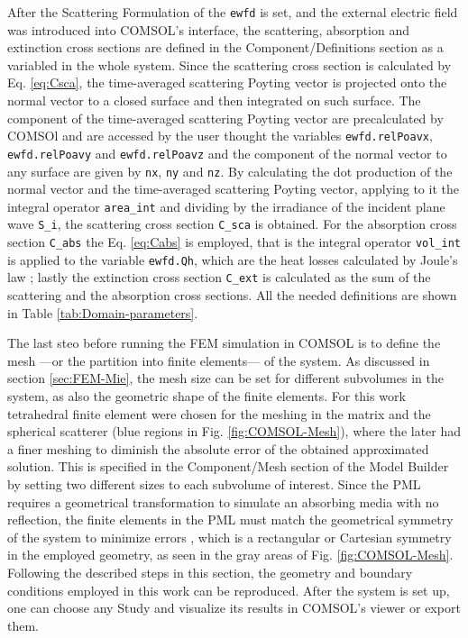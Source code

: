 After the Scattering Formulation of the \lstinline!ewfd! is set, and the external electric field was introduced into COMSOL's interface, the scattering, absorption and extinction cross sections are defined in the Component/Definitions section as a variabled in the whole system. Since the scattering cross section is calculated by Eq. \eqref{eq:Csca}, the time-averaged scattering Poyting vector is projected onto the normal vector to a closed surface and then integrated on such surface. The component of the time-averaged scattering Poyting vector are precalculated by COMSOl and are accessed by the user thought the variables  \lstinline!ewfd.relPoavx!, \lstinline!ewfd.relPoavy! and \lstinline!ewfd.relPoavz! \cite{comsol_wave} and the component of the normal vector to any surface are given by \lstinline!nx!, \lstinline!ny! and \lstinline!nz!. By calculating the dot production of the normal vector and the time-averaged scattering Poyting vector, applying to it the integral operator \lstinline!area_int! and dividing by the irradiance of the incident plane wave \lstinline!S_i!, the scattering cross section  \lstinline!C_sca! is obtained. For the absorption cross section \lstinline!C_abs! the Eq. \eqref{eq:Cabs} is employed, that is the integral operator \lstinline!vol_int! is applied to the variable \lstinline!ewfd.Qh!, which are the heat losses calculated by Joule's law \cite{comsol_wave}; lastly the extinction cross section \lstinline!C_ext! is calculated as the sum of the scattering and the absorption cross sections. All the needed definitions are shown in Table \ref{tab:Domain-parameters}.

The last steo before running the FEM simulation in COMSOL is to define the mesh ---or the partition into finite elements--- of the system.  As discussed in section \ref{sec:FEM-Mie}, the mesh size can be set for different subvolumes in the system, as also the geometric shape of the finite elements. For this work tetrahedral finite element were chosen for the meshing in the matrix and the spherical scatterer (blue regions in Fig. \ref{fig:COMSOL-Mesh}), where the later had a finer meshing to diminish the absolute error of the obtained approximated solution. This is specified in the Component/Mesh section of the Model Builder by setting two different sizes to each subvolume of interest. Since the PML requires a geometrical transformation to simulate an absorbing media with no reflection, the finite elements in the PML must match the  geometrical symmetry of the system to minimize errors \cite{comsol_doc}, which is a rectangular or Cartesian symmetry in the employed geometry, as seen in the gray areas of  Fig. \ref{fig:COMSOL-Mesh}. Following the described steps in this section, the  geometry and boundary conditions employed in this work can be reproduced. After the system is set up, one can choose any Study and visualize its results in COMSOL's viewer or export them.

